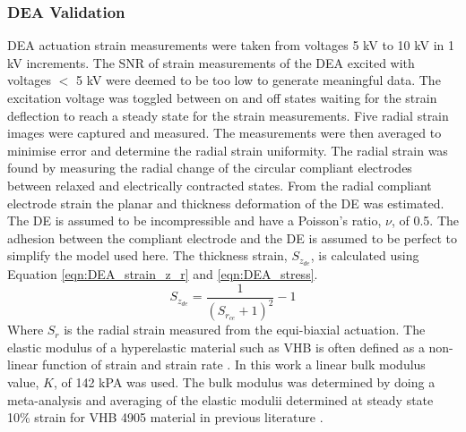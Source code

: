 \subsubsection{DEA Validation} %
\label{subsubsec:dea_validation1}
DEA actuation strain measurements were taken from voltages 5 kV to 10 kV in 1 kV increments. The SNR of strain measurements of the DEA excited with voltages $<$ 5 kV were deemed to be too low to generate meaningful data. The excitation voltage was toggled between on and off states waiting for the strain deflection to reach a steady state for the strain measurements. Five radial strain images were captured and measured. The measurements were then averaged to minimise error and determine the radial strain uniformity. The radial strain was found by measuring the radial change of the circular compliant electrodes between relaxed and electrically contracted states. From the radial compliant electrode strain the planar and thickness deformation of the DE was estimated. The DE is assumed to be incompressible and have a Poisson's ratio, $\nu$, of 0.5. The adhesion between the compliant electrode and the DE is assumed to be perfect to simplify the model used here. The thickness strain, $S_{z_{de}}$, is calculated using Equation \ref{eqn:DEA_strain_z_r}\cite{Carpi2015} and \ref{eqn:DEA_stress}.
\begin{equation}
	S_{z_{de}} = \frac{1}{(S_{r_{ce}} + 1)^2} - 1
	\label{eqn:DEA_strain_z_r}
\end{equation}
Where $S_r$ is the radial strain measured from the equi-biaxial actuation. 
The elastic modulus of a hyperelastic material such as VHB is often defined as a non-linear function of strain and strain rate\cite{Liu2018} . In this work a linear bulk modulus value, $K$, of 142 kPA was used. The bulk modulus was determined by doing a meta-analysis and averaging of the elastic modulii determined at steady state 10\% strain for VHB 4905 material in previous literature\cite{Liu2018, Helal2018, Huang2023} .
